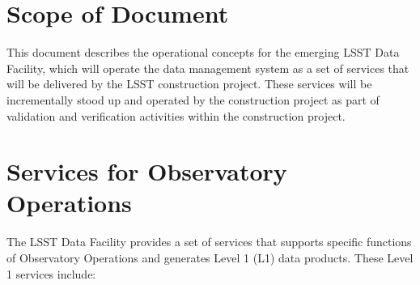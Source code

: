 \section{Scope of Document}

This document describes the operational concepts for the emerging LSST Data
Facility, which will operate the data management system as a set of services
that will be delivered by the LSST construction project. These services will be
incrementally stood up and operated by the construction project as part of
validation and verification activities within the construction project.

\section{Services for Observatory Operations}
The LSST Data Facility provides a set of services that supports specific
functions of Observatory Operations and generates Level 1 (L1) data products.
These Level 1 services include:

